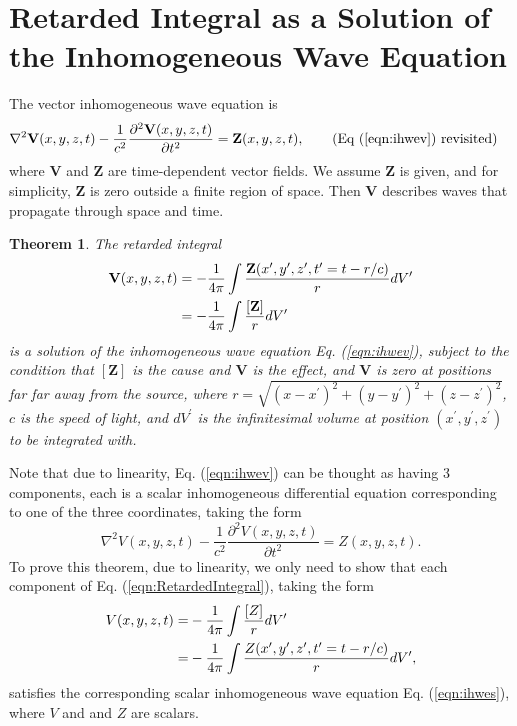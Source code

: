 \documentclass[11pt]{article}              %
\newtheorem{theorem}{Theorem}
\begin{document}
\section{Retarded Integral as a Solution of the Inhomogeneous Wave Equation} \label{RetardedIntegrals}  %
The vector inhomogeneous wave equation is
\begin{align}
	\nabla^2 {\mathbf V}(x,y,z,t) -\frac{1}{c^2}\frac{\partial^2 {\mathbf V}(x,y,z,t)}{\partial t^2}&={\mathbf Z}(x,y,z,t),\tag{Eq (\ref{eqn:ihwev}) revisited}
\end{align}
where ${\mathbf V}$ and ${\mathbf Z}$ are time-dependent vector fields. We assume ${\mathbf Z}$ is given, and for simplicity, ${\mathbf Z}$ is zero outside a finite region of space. Then ${\mathbf V}$ describes waves that propagate through space and time.
\begin{theorem}\label{theorem1}
	The retarded integral 
	\begin{align}
		{\mathbf V}(x,y,z,t)&=-\frac{1}{4\pi}\int \frac{{\mathbf Z}(x^\prime,y^\prime,z^\prime,t^\prime=t-r/c)}{r}dV^\prime\notag\\
		&=-\frac{1}{4\pi}\int \frac{[{\mathbf Z}]}{r}dV^\prime\label{eqn:RetardedIntegral}
	\end{align}
is a solution of the inhomogeneous wave equation Eq. (\ref{eqn:ihwev}), subject to the condition that $[{\mathbf Z}]$ is the cause and ${\mathbf V}$ is the effect, and ${\mathbf V}$ is zero at positions far far away from the source, where $r=\sqrt{(x-x^\prime)^2+(y-y^\prime)^2+(z-z^\prime)^2}$, $c$ is the speed of light,
and $dV^\prime$ is the infinitesimal volume at position $(x^\prime, y^\prime, z^\prime)$ to be integrated with.
\end{theorem}
 
Note that due to linearity, Eq. (\ref{eqn:ihwev}) can be thought as having 3 components, each is a scalar inhomogeneous differential equation corresponding to one of the three coordinates, taking the form
\begin{equation}
	\nabla^2 V(x,y,z,t) -\frac{1}{c^2}\frac{\partial^2 V(x,y,z,t)}{\partial t^2}=Z(x,y,z,t).\label{eqn:ihwes}
\end{equation}
To prove this theorem, due to linearity, we only need to show that each component of Eq. (\ref{eqn:RetardedIntegral}), taking the form
 \begin{align}
{V}(x,y,z,t)=&-\frac{1}{4\pi}\int \frac{[{Z}]}{r}dV^\prime\notag\\
=&-\frac{1}{4\pi}\int \frac{{Z}(x^\prime,y^\prime,z^\prime,t^\prime=t-r/c)}{r}dV^\prime,\label{eqn:RetardedIntegrals}
\end{align}
satisfies the corresponding scalar inhomogeneous wave equation Eq. (\ref{eqn:ihwes}), where $V$ and and $Z$ are scalars.
\end{document}
